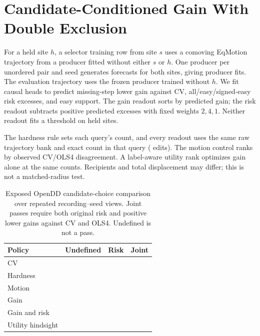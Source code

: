 \section{Candidate-Conditioned Gain With Double Exclusion}

For a held site $h$, a selector training row from site $s$
uses a comoving EqMotion trajectory from a producer fitted
without either $s$ or $h$. One producer per unordered pair and
seed generates forecasts for both sites, giving
\AdvantageProducers{} producer fits. The evaluation trajectory
uses the frozen producer trained without $h$. We fit
\AdvantageHeads{} causal heads to predict missing-step lower gain
against CV, all/easy/signed-easy risk excesses, and easy
support. The gain readout sorts by predicted gain; the risk
readout subtracts positive predicted excesses with fixed
weights $2,4,1$. Neither readout fits a threshold on held sites.

The hardness rule sets each query's count, and every readout
uses the same raw trajectory bank and exact count in that
query (\AdvantageEdits{} edits). The motion control ranks by
observed CV/OLS4 disagreement. A label-aware utility rank
optimizes gain alone at the same counts. Recipients and total
displacement may differ; this is not a matched-radius test.

\begin{table}[h]
\centering
\caption{Exposed OpenDD candidate-choice comparison over
\AdvantageViews{} repeated recording--seed views. Joint passes
require both original risk and positive lower gains against
CV and OLS4. Undefined is not a pass.}
\small
\begin{tabular}{lrrr}
\toprule
Policy & Undefined & Risk & Joint \\
\midrule
CV & \AdvantageCvUndefined{} & \AdvantageCvRisk{} & \AdvantageCvJoint{} \\
Hardness & \AdvantageHardnessUndefined{} & \AdvantageHardnessRisk{} & \AdvantageHardnessJoint{} \\
Motion & \AdvantageMotionUndefined{} & \AdvantageMotionRisk{} & \AdvantageMotionJoint{} \\
Gain & \AdvantageGainUndefined{} & \AdvantageGainRisk{} & \AdvantageGainJoint{} \\
Gain and risk & \AdvantageRiskUndefined{} & \AdvantageRiskRisk{} & \AdvantageRiskJoint{} \\
Utility hindsight & \AdvantageOracleUndefined{} & \AdvantageOracleRisk{} & \AdvantageOracleJoint{} \\
\bottomrule
\end{tabular}
\end{table}

